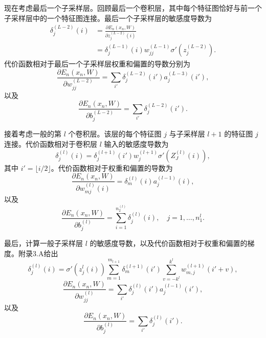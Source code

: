 
现在考虑最后一个子采样层。回顾最后一个卷积层，其中每个特征图恰好与前一个子采样层中的一个特征图连接。最后一个子采样层的敏感度导数为
\begin{equation}
\begin{aligned}
\delta_j^{(L-2)}(i)
&=\frac{\partial E_n(x_n,W)}{\partial z_j^{(L-2)}(i)}\\
&=\delta_j^{(L-1)}(i)w_{jj}^{(L-1)}\sigma'(z_j^{(L-2)}).
\end{aligned}
\tag{3.35}
\end{equation}
代价函数相对于最后一个子采样层权重和偏置的导数分别为
\begin{equation}
\frac{\partial E_n(x_n,W)}{\partial w_{jj}^{(L-2)}}
=\sum_{i'}\delta_j^{(L-2)}(i')a_j^{(L-3)}(i'),
\tag{3.36}
\end{equation}
以及
\begin{equation}
\frac{\partial E_n(x_n,W)}{\partial b_j^{(L-2)}}
=\sum_{i'}\delta_j^{(L-2)}(i').
\tag{3.37}
\end{equation}


接着考虑一般的第 $l$ 个卷积层。该层的每个特征图 $j$ 与子采样层 $l+1$ 的特征图 $j$ 连接。代价函数相对于卷积层 $l$ 输入的敏感度导数为
\begin{equation}
\delta_j^{(l)}(i)
=\delta_j^{(l+1)}(i')w_j^{(l+1)}\sigma'(Z_J^{(l)}(i)),
\tag{3.38}
\end{equation}
其中 $i'=\lfloor i/2\rfloor$。代价函数相对于权重和偏置的导数为
\begin{equation}
\frac{\partial E_n(x_n,W)}{\partial w_{mj}^{(l)}(i)}
=\delta_m^{(l)}(i)a_j^{(l-1)}(i),
\tag{3.39}
\end{equation}
以及
\begin{equation}
\frac{\partial E_n(x_n,W)}{\partial b_j^{(l)}}
=\sum_{i=1}^{n_2^{(l)}}\delta_j^{(l)}(i),
\quad j=1,\ldots,n_1^l.
\tag{3.40}
\end{equation}


最后，计算一般子采样层 $l$ 的敏感度导数，以及代价函数相对于权重和偏置的梯度。附录3.A给出
\begin{equation}
\delta_j^{(l)}(i)=\sigma'(z_j^l(i))
\sum_{m=1}^{m_{l+1}}\delta_m^{(l+1)}(i')
\sum_{v=-k^l}^{k^l}w_{m,j}^{(l+1)}(i'+v),
\tag{3.41}
\end{equation}
\begin{equation}
\frac{\partial E_n(x_n,W)}{\partial w_{jj}^{(l)}}
=\sum_{i'}\delta_j^{(l)}(i')a_j^{(l-1)}(i'),
\tag{3.42}
\end{equation}
以及
\begin{equation}
\frac{\partial E_n(x_n,W)}{\partial b_j^{(l)}}
=\sum_{i'}\delta_j^{(l)}(i').
\tag{3.43}
\end{equation}
\FloatBarrier
